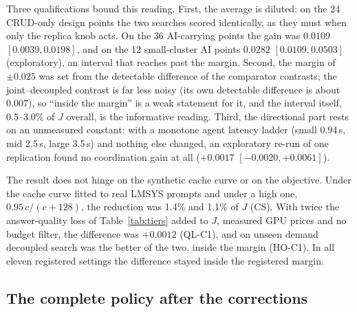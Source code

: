 Three qualifications bound this reading. First, the average is diluted: on
the 24 CRUD-only design points the two searches scored identically, as they
must when only the replica knob acts. On the 36 AI-carrying points the gain
was $0.0109$ $[0.0039,0.0198]$, and on the 12 small-cluster AI points
$0.0282$ $[0.0109,0.0503]$ (exploratory), an interval that reaches past the
margin. Second, the margin of $\pm0.025$ was set from the detectable
difference of the comparator contrasts; the joint--decoupled contrast is
far less noisy (its own detectable difference is about $0.007$), so
``inside the margin'' is a weak statement for it, and the interval itself,
0.5--3.0\% of $J$ overall, is the informative reading. Third, the
directional part rests on an unmeasured constant: with a monotone agent
latency ladder (small 0.94\,s, mid 2.5\,s, large 3.5\,s) and nothing else
changed, an exploratory re-run of one replication found no coordination
gain at all ($+0.0017$ $[-0.0020,+0.0061]$).

The result does not hinge on the synthetic cache curve or on the
objective. Under the cache curve fitted to real LMSYS prompts and under a
high one, $0.95\,c/(c+128)$, the reduction was 1.4\% and 1.1\% of $J$
(CS). With twice the answer-quality loss of Table~\ref{tab:tiers} added to
$J$, measured GPU prices and no budget filter, the difference was
$+0.0012$ (QL-C1), and on unseen demand decoupled search was the better of
the two, inside the margin (HO-C1). In all eleven registered settings the
difference stayed inside the registered margin.

\subsection{The complete policy after the corrections}
\label{sec:remains}

\begin{table}[t]
\caption{Mean outcome per arm in JOINTNESS (60 design points $\times$ 5
replications, shared seeds). Cost: simulated dollars per run. Viol.: mean
SLO violation. Excess: uncapped overshoot. Shed: tenant-steps with AI on
tier ``none''. Over.: tenant-steps over the tenant's budget (\jcac{} filters
on projected, not realised, cost).}
\label{tab:arms}
\centering\tablefont

\end{table}

\begin{table}[t]
\caption{What survives the corrections: \jcac{} minus comparator on $J$
(mean paired difference over design points, 95\% bootstrap CI; negative:
\jcac{} better). B: better; T: tie; W: worse; EQ: inside the $\pm0.025$
margin. The cheapest-tier stack was not held to the cluster caps (see
Section~\ref{sec:comparators}).}
\label{tab:post}
\centering\tablefont

\end{table}

